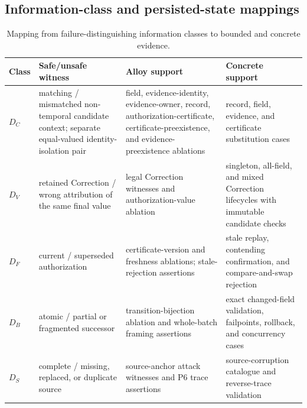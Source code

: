 \subsection{Information-class and persisted-state mappings}
\begin{table}[t]
\centering
\footnotesize
\caption{Mapping from failure-distinguishing information classes to bounded and concrete evidence.}
\label{tab:distinction-evidence}
\begin{tabularx}{\textwidth}{@{}l>{\raggedright\arraybackslash}p{}>{\raggedright\arraybackslash}p{}>{\raggedright\arraybackslash}X@{}}
\toprule
Class & Safe/unsafe witness & Alloy support & Concrete support \\
\midrule
$D_C$ & matching / mismatched non-temporal candidate context; separate equal-valued identity-isolation pair & field, evidence-identity, evidence-owner, record, authorization-certificate, certificate-preexistence, and evidence-preexistence ablations & record, field, evidence, and certificate substitution cases \\
$D_V$ & retained Correction / wrong attribution of the same final value & legal Correction witnesses and authorization-value ablation & singleton, all-field, and mixed Correction lifecycles with immutable candidate checks \\
$D_F$ & current / superseded authorization & certificate-version and freshness ablations; stale-rejection assertions & stale replay, contending confirmation, and compare-and-swap rejection \\
$D_B$ & atomic / partial or fragmented successor & transition-bijection ablation and whole-batch framing assertions & exact changed-field validation, failpoints, rollback, and concurrency cases \\
$D_S$ & complete / missing, replaced, or duplicate source & source-anchor attack witnesses and P6 trace assertions & source-corruption catalogue and reverse-trace validation \\
\bottomrule
\end{tabularx}
\end{table}

